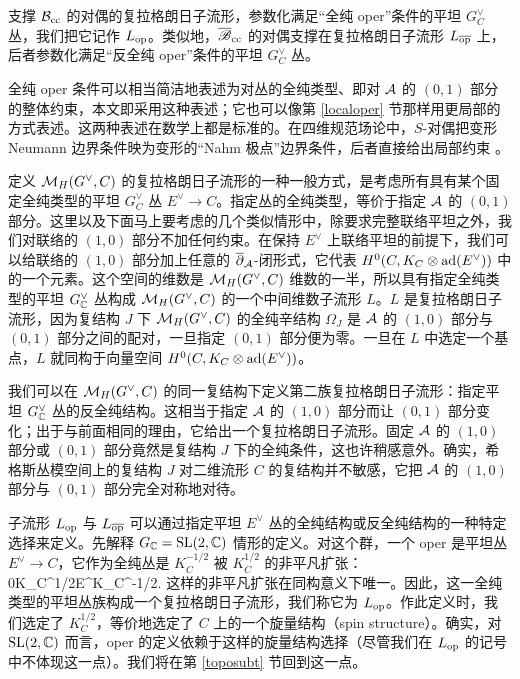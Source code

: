 支撑 ${\mathcal B}_{\mathrm{cc}}$ 的对偶的复拉格朗日子流形，参数化满足“全纯 oper”条件的平坦 $G^\vee_C$ 丛，我们把它记作 $L_{\mathrm{op}}$。类似地，${\overline {\mathscr B}}_{\mathrm{cc}}$ 的对偶支撑在复拉格朗日子流形 $L_{\overline{\mathrm{op}}}$ 上，后者参数化满足“反全纯 oper”条件的平坦 $G^\vee_C$ 丛。

全纯 oper 条件可以相当简洁地表述为对丛的全纯类型、即对 ${\mathcal A}$ 的 $(0,1)$ 部分的整体约束，本文即采用这种表述；它也可以像第 \ref{localoper} 节那样用更局部的方式表述。这两种表述在数学上都是标准的。在四维规范场论中，$S$-对偶把变形 Neumann 边界条件映为变形的“Nahm 极点”边界条件，后者直接给出局部约束 \cite{GWknots}。

定义 ${\mathcal M}_H(G^\vee,C)$ 的复拉格朗日子流形的一种一般方式，是考虑所有具有某个固定全纯类型的平坦 $G^\vee_C$ 丛 $E^\vee\to C$。指定丛的全纯类型，等价于指定 ${\mathcal A}$ 的 $(0,1)$ 部分。这里以及下面马上要考虑的几个类似情形中，除要求完整联络平坦之外，我们对联络的 $(1,0)$ 部分不加任何约束。在保持 $E^\vee$ 上联络平坦的前提下，我们可以给联络的 $(1,0)$ 部分加上任意的 $\overline\partial_{\mathcal A}$-闭形式，它代表 $H^0(C,K_C\otimes {\mathrm{ad}}(E^\vee))$ 中的一个元素。这个空间的维数是 ${\mathcal M}_H(G^\vee,C)$ 维数的一半，所以具有指定全纯类型的平坦 $G^\vee_{\mathbb C}$ 丛构成 ${\mathcal M}_H(G^\vee,C)$ 的一个中间维数子流形 $L$。$L$ 是复拉格朗日子流形，因为复结构 $J$ 下 ${\mathcal M}_H(G^\vee,C)$ 的全纯辛结构 $\Omega_J$ 是 ${\mathcal A}$ 的 $(1,0)$ 部分与 $(0,1)$ 部分之间的配对，一旦指定 $(0,1)$ 部分便为零。一旦在 $L$ 中选定一个基点，$L$ 就同构于向量空间 $H^0(C,K_C\otimes {\mathrm{ad}}(E^\vee))$。

我们可以在 ${\mathcal M}_H(G^\vee,C)$ 的同一复结构下定义第二族复拉格朗日子流形：指定平坦 $G^\vee_{\mathbb C}$ 丛的反全纯结构。这相当于指定 ${\mathcal A}$ 的 $(1,0)$ 部分而让 $(0,1)$ 部分变化；出于与前面相同的理由，它给出一个复拉格朗日子流形。固定 ${\mathcal A}$ 的 $(1,0)$ 部分或 $(0,1)$ 部分竟然是复结构 $J$ 下的全纯条件，这也许稍感意外。确实，希格斯丛模空间上的复结构 $J$ 对二维流形 $C$ 的复结构并不敏感，它把 ${\mathcal A}$ 的 $(1,0)$ 部分与 $(0,1)$ 部分完全对称地对待。

子流形 $L_{\mathrm{op}}$ 与 $L_{\overline{\mathrm{op}}}$ 可以通过指定平坦 $E^\vee$ 丛的全纯结构或反全纯结构的一种特定选择来定义。先解释 $G_{\mathbb C}={\mathrm{SL}}(2,{\mathbb C})$ 情形的定义。对这个群，一个 oper 是平坦丛 $E^\vee\to C$，它作为全纯丛是 $K_C^{-1/2}$ 被 $K_C^{1/2}$ 的非平凡扩张：
\be\label{nonex}0\to K_C^{1/2}\to E^\vee\to K_C^{-1/2}. \ee
这样的非平凡扩张在同构意义下唯一。因此，这一全纯类型的平坦丛族构成一个复拉格朗日子流形，我们称它为 $L_{\mathrm{op}}$。作此定义时，我们选定了 $K_C^{1/2}$，等价地选定了 $C$ 上的一个旋量结构（spin structure）。确实，对 ${\mathrm{SL}}(2,{\mathbb C})$ 而言，oper 的定义依赖于这样的旋量结构选择（尽管我们在 $L_{\mathrm{op}}$ 的记号中不体现这一点）。我们将在第 \ref{toposubt} 节回到这一点。

